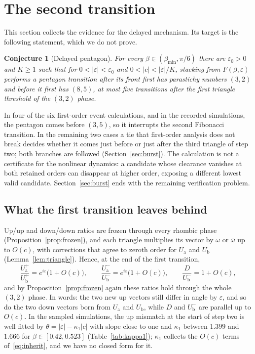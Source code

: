 \documentclass[11pt]{amsart}
\newtheorem{conjecture}[theorem]{Conjecture}
\theoremstyle{definition}
\newcommand{\eps}{\varepsilon}
\newcommand{\Ua}{U_{\mathrm a}}
\newcommand{\Ub}{U_{\mathrm b}}
\newcommand{\up}[1]{#1^{+}}
\newcommand{\dn}[1]{#1^{-}}
\begin{document}
\section{The second transition}\label{sec:steptwo}

This section collects the evidence for the delayed mechanism. Its target is the following statement,
which we do not prove.

\begin{conjecture}[Delayed pentagon]\label{thm:B}
For every $\beta\in(\beta_{\min},\pi/6)$ there are $\eps_0>0$ and $K\ge1$ such that for
$0<|\eps|<\eps_0$ and $0<|c|<|\eps|/K$, stacking from $F(\beta,\eps)$ performs a pentagon transition
after its front first has parastichy numbers $(3,2)$ and before it first has $(8,5)$, at most five
transitions after the first triangle threshold of the $(3,2)$ phase.
\end{conjecture}

\noindent In four of the six first-order event calculations, and in the recorded simulations, the
pentagon comes before $(3,5)$, so it interrupts the second Fibonacci transition. In the remaining two
cases a tie that first-order analysis does not break decides whether it comes just before or just
after the third triangle of step two; both branches are followed (Section~\ref{sec:burst}). The
calculation is not a certificate for the nonlinear dynamics: a candidate whose clearance vanishes at
both retained orders can disappear at higher order, exposing a different lowest valid candidate.
Section~\ref{sec:burst} ends with the remaining verification problem.

\subsection{What the first transition leaves behind}
Up/up and down/down ratios are frozen through every rhombic phase (Proposition~\ref{prop:frozen}), and each
triangle multiplies its vector by $\omega$ or $\bar\omega$ up to $O(c)$, with corrections that agree to
zeroth order for $\Ua$ and $\Ub$ (Lemma~\ref{lem:triangle}). Hence, at the end of the first transition,
\begin{equation}\label{eq:inherit}
\frac{\up{\Ua}}{\up{\Ub}}=e^{i\eps}\bigl(1+O(c)\bigr),\qquad
\frac{\dn{\Ua}}{\dn{\Ub}}=e^{i\eps}\bigl(1+O(c)\bigr),\qquad
\frac{D}{\dn{\Ub}}=1+O(c),
\end{equation}
and by Proposition~\ref{prop:frozen} again these ratios hold through the whole $(3,2)$ phase. In words:
the two new up vectors still differ in angle by $\eps$, and so do the two down vectors born from $\Ua$
and $\Ub$, while $D$ and $\dn{\Ub}$ are parallel up to $O(c)$. In the sampled
simulations, the up mismatch at the start of step two is well fitted by
$\theta=|\eps|-\kappa_1|c|$ with slope close to one
and $\kappa_1$ between $1.399$ and $1.666$ for $\beta\in[0.42,0.523]$ (Table~\ref{tab:kappa1}); $\kappa_1$
collects the $O(c)$ terms of~\eqref{eq:inherit}, and we have no closed form for it.
\end{document}
